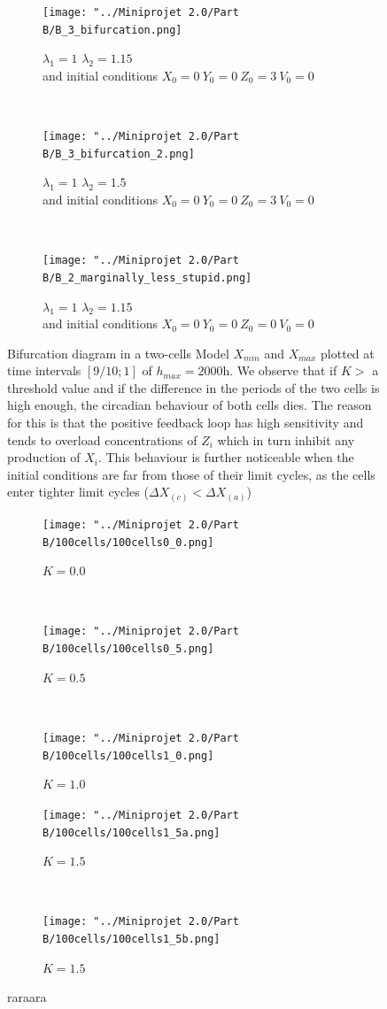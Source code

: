 \documentclass[10pt,a4paper,oneside,twocolumn]{article}
\numberwithin{equation}{section} %
\begin{document}
    \begin{figure}
    \centering
	\begin{subfigure}[b]{0.3\textwidth}
	    \texttt{[image: "../Miniprojet 2.0/Part B/B\_3\_bifurcation.png]}
	    \caption{$\lambda_1=1$ $\lambda_2=1.15$ \\
	    and initial conditions $X_0=0~Y_0=0~Z_0=3~V_0=0$}
	\end{subfigure}
	~
	\begin{subfigure}[b]{0.3\textwidth}
	    \texttt{[image: "../Miniprojet 2.0/Part B/B\_3\_bifurcation\_2.png]}
	    \caption{$\lambda_1=1$ $\lambda_2=1.5$ \\
	    and initial conditions $X_0=0~Y_0=0~Z_0=3~V_0=0$}
	\end{subfigure}
	~ 
	\begin{subfigure}[b]{0.3\textwidth}
	    \texttt{[image: "../Miniprojet 2.0/Part B/B\_2\_marginally\_less\_stupid.png]}
	    \caption{$\lambda_1=1$ $\lambda_2=1.15$ \\
	    and initial conditions $X_0=0~Y_0=0~Z_0=0~V_0=0$}
	\end{subfigure}

	\caption{Bifurcation diagram in a two-cells Model $X_{min}$ and $X_{max}$ plotted at time intervals $[9/10; 1]$ of $h_{max}=2000$h. We observe that if $K>$ a threshold value and if the difference in the periods of the two cells is high enough, the circadian behaviour of both cells dies. The reason for this is that the positive feedback loop has high sensitivity and tends to overload concentrations of $Z_i$ which in turn inhibit any production of $X_i$. This behaviour is further noticeable when the initial conditions are far from those of their limit cycles, as the cells enter tighter limit cycles ($\Delta X_{(c)} < \Delta X_{(a)}$)}
	\end{figure}


    \begin{figure}
    \centering
	\begin{subfigure}[b]{0.45\textwidth}
	    \texttt{[image: "../Miniprojet 2.0/Part B/100cells/100cells0\_0.png]}
	    \caption{$K=0.0$}
	\end{subfigure}
	~ 
	\begin{subfigure}[b]{0.45\textwidth}
	    \texttt{[image: "../Miniprojet 2.0/Part B/100cells/100cells0\_5.png]}
	    \caption{$K=0.5$}
	\end{subfigure}
	~ 
	\begin{subfigure}[b]{0.45\textwidth}
	    \texttt{[image: "../Miniprojet 2.0/Part B/100cells/100cells1\_0.png]}
	    \caption{$K=1.0$}
	\end{subfigure}
	 
	\begin{subfigure}[b]{0.45\textwidth}
	    \texttt{[image: "../Miniprojet 2.0/Part B/100cells/100cells1\_5a.png]}
	    \caption{$K=1.5$}
	\end{subfigure}
	~ 
	\begin{subfigure}[b]{0.45\textwidth}
	    \texttt{[image: "../Miniprojet 2.0/Part B/100cells/100cells1\_5b.png]}
	    \caption{$K=1.5$}
	\end{subfigure}

	\caption{raraara}
    \end{figure}
\end{document}
